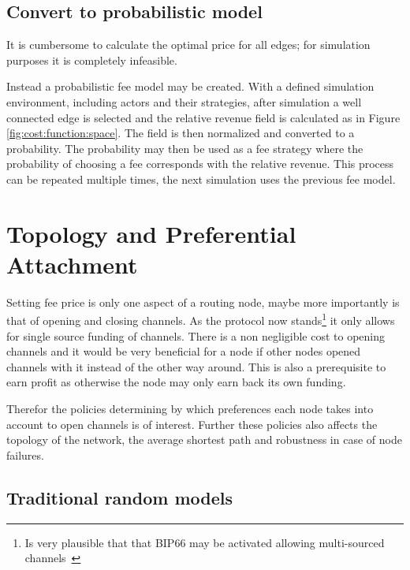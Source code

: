 \subsection{Convert to probabilistic model}
\label{probabilistic}

It is cumbersome to calculate the optimal price for all edges; for simulation purposes it is completely infeasible. 

Instead a probabilistic fee model may be created. With a defined simulation environment, including actors and their strategies, after simulation a well connected edge is selected and the relative revenue field is calculated as in Figure \ref{fig:cost:function:space}. The field is then normalized and converted to a probability. The probability may then be used as a fee strategy where the probability of choosing a fee corresponds with the relative revenue. This process can be repeated multiple times, the next simulation uses the previous fee model. 


\section{Topology and Preferential Attachment}

Setting fee price is only one aspect of a routing \gls{node}, maybe more importantly is that of opening and closing channels.
As the protocol now stands\footnote{Is very plausible that that BIP66 may be activated allowing multi-sourced channels~\cite{bip:0118:sighash:noinput}} it only allows for single source funding of channels. There is a non negligible cost to opening channels and it would be very beneficial for a node if other nodes opened channels with it instead of the other way around. This is also a prerequisite to earn profit as otherwise the \gls{node} may only earn back its own funding. 

Therefor the policies determining by which preferences each \gls{node} takes into account to open channels is of interest. Further these policies also affects the topology of the network, the average shortest \gls{path} and robustness in case of node failures.

\subsection{Traditional random models}

